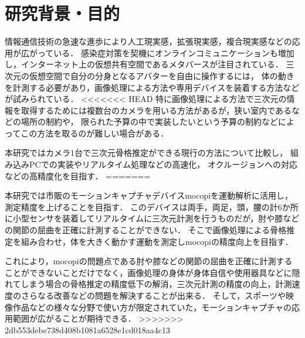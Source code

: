 \documentclass[titlepage]{jarticle}
\begin{document}
\maketitle

%
%
\section{研究背景・目的}
%
情報通信技術の急速な進歩により人工現実感，拡張現実感，複合現実感などの応用が広がっている．
感染症対策を契機にオンラインコミュニケーションも増加し，インターネット上の仮想共有空間であるメタバースが注目されている．
三次元の仮想空間で自分の分身となるアバターを自由に操作するには，
体の動きを計測する必要があり，画像処理による方法や専用デバイスを装着する方法などが試みられている．
<<<<<<< HEAD
特に画像処理による方法で三次元の情報を取得するためには複数台のカメラを用いる方法があるが，狭い室内であるなどの場所の制約や，
限られた予算の中で実装したいという予算の制約などによってこの方法を取るのが難しい場合がある．

本研究ではカメラ1台で三次元骨格推定ができる現行の方法について比較し，
組み込みPCでの実装やリアルタイム処理などの高速化，
オクルージョンへの対応などの高精度化を目指す．
=======

本研究では市販のモーションキャプチャデバイスmocopiを運動解析に活用し，測定精度を上げることを目指す．
このデバイスは両手，両足，頭，腰の計6か所に小型センサを装着してリアルタイムに三次元計測を行うものだが，肘や膝などの関節の屈曲を正確に計測することができない．
そこで画像処理による骨格推定を組み合わせ，体を大きく動かす運動を測定しmocopiの精度向上を目指す．

これにより，mocopiの問題点である肘や膝などの関節の屈曲を正確に計測することができないことだけでなく，画像処理の身体が身体自信や使用器具などに隠れてしまう場合の骨格推定の精度低下の解消，三次元計測の精度の向上，計測速度のさらなる改善などの問題を解決することが出来る．
そして，スポーツや映像作品などの様々な分野で使い方が限定されていた，モーションキャプチャの応用範囲が広がることが期待できる．
>>>>>>> 2db553debe738d408b1081a6528e1cd018aa4c13
%
%
\end{document}
